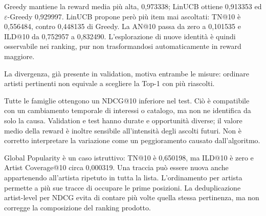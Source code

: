 Greedy mantiene la reward media più alta, 0,973338; LinUCB ottiene 0,913353 ed $\varepsilon$-Greedy 0,929997. LinUCB propone però più item mai ascoltati: TN@10 è 0,556484, contro 0,448135 di Greedy. La AN@10 passa da zero a 0,101535 e ILD@10 da 0,752957 a 0,832490. L'esplorazione di nuove identità è quindi osservabile nei ranking, pur non trasformandosi automaticamente in reward maggiore.

La divergenza, già presente in validation, motiva entrambe le misure: ordinare artisti pertinenti non equivale a scegliere la Top-1 con più riascolti.


\begin{table}[htbp]\centering\small

\caption{Variazioni test meno validation. La variazione relativa riguarda NDCG@10; la reward è confrontata in differenza assoluta.}\label{tab:valtest}
\end{table}

Tutte le famiglie ottengono un NDCG@10 inferiore nel test. Ciò è compatibile con un cambiamento temporale di interessi o catalogo, ma non ne identifica da solo la causa. Validation e test hanno durate e opportunità diverse; il valore medio della reward è inoltre sensibile all'intensità degli ascolti futuri. Non è corretto interpretare la variazione come un peggioramento causato dall'algoritmo.

\par\noindent\begin{minipage}{\linewidth}
Global Popularity è un caso istruttivo: TN@10 è 0,650198, ma ILD@10 è zero e Artist Coverage@10 circa 0,000319. Una traccia può essere nuova anche appartenendo all'artista ripetuto in tutta la lista. L'ordinamento per artista permette a più sue tracce di occupare le prime posizioni. La deduplicazione artist-level per NDCG evita di contare più volte quella stessa pertinenza, ma non corregge la composizione del ranking prodotto.
\end{minipage}\par

\begin{table}[htbp]\centering\scriptsize

\caption{Coverage held-out distinta per cutoff. $C_I$ è catalog coverage e $C_G$ artist coverage; gli alias senza suffisso del CSV corrispondono alle ultime due colonne.}\label{tab:coverage}
\end{table}

